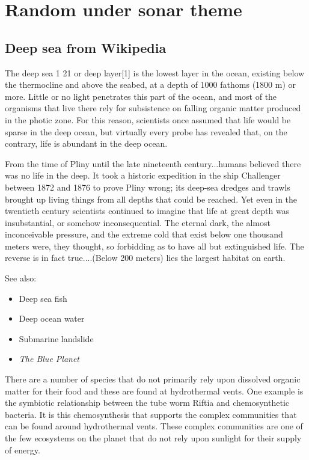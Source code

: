 \documentclass[twocolumn]{article}
\begin{document}
\section{Random under sonar theme}

\subsection{Deep sea from Wikipedia}
The deep sea 1 21 or deep layer[1] is the lowest layer in the ocean, existing below the thermocline and above the seabed, at a depth of 1000 fathoms (1800 m) or more. Little or no light penetrates this part of the ocean, and most of the organisms that live there rely for subsistence on falling organic matter produced in the photic zone. For this reason, scientists once assumed that life would be sparse in the deep ocean, but virtually every probe has revealed that, on the contrary, life is abundant in the deep ocean.

    From the time of Pliny until the late nineteenth century...humans believed there was no life in the deep. It took a historic expedition in the ship Challenger between 1872 and 1876 to prove Pliny wrong; its deep-sea dredges and trawls brought up living things from all depths that could be reached. Yet even in the twentieth century scientists continued to imagine that life at great depth was insubstantial, or somehow inconsequential. The eternal dark, the almost inconceivable pressure, and the extreme cold that exist below one thousand meters were, they thought, so forbidding as to have all but extinguished life. The reverse is in fact true....(Below 200 meters) lies the largest habitat on earth.

 See also:
\begin{itemize}
\item Deep sea fish
\item Deep ocean water
\item Submarine landslide
\item \emph{The Blue Planet}
\end{itemize}

There are a number of species that do not primarily rely upon dissolved organic matter for their food and these are found at hydrothermal vents. One example is the symbiotic relationship between the tube worm Riftia and chemosynthetic bacteria. It is this chemosynthesis that supports the complex communities that can be found around hydrothermal vents. These complex communities are one of the few ecosystems on the planet that do not rely upon sunlight for their supply of energy.
\end{document}
